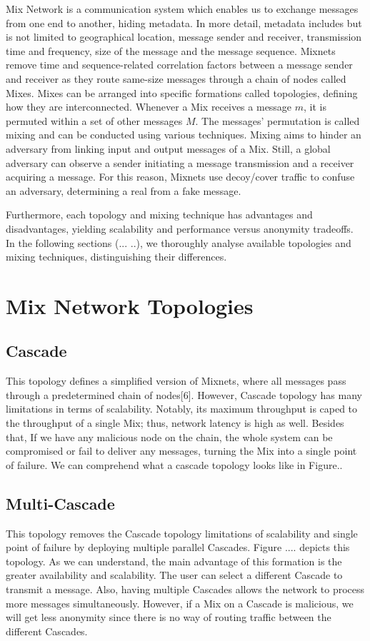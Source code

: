 \documentclass[logo,msc,cyber]{infthesis}   %
\begin{document}
Mix Network is a communication system which enables us to exchange messages from
one end to another, hiding metadata. In more detail, metadata includes but is
not limited to geographical location, message sender and receiver, transmission
time and frequency, size of the message and the message sequence. Mixnets remove
time and sequence-related correlation factors between a message sender and
receiver as they route same-size messages through a chain of nodes called Mixes.
Mixes can be arranged into specific formations called topologies, defining how
they are interconnected. Whenever a Mix receives a message $m$, it is permuted
within a set of other messages $M$. The messages' permutation is called mixing and
can be conducted using various techniques. Mixing aims to hinder an adversary
from linking input and output messages of a Mix. Still, a global adversary can
observe a sender initiating a message transmission and a receiver acquiring a
message. For this reason, Mixnets use decoy/cover traffic to confuse an
adversary, determining a real from a fake message. 

Furthermore, each topology and mixing technique has advantages and
disadvantages, yielding scalability and performance versus anonymity tradeoffs.
In the following sections (... ..), we thoroughly analyse available topologies
and mixing techniques, distinguishing their differences.


\section{Mix Network Topologies}

\subsection{Cascade}
This topology defines a simplified version of Mixnets, where all messages pass
through a predetermined chain of nodes[6]. However, Cascade topology has many
limitations in terms of scalability. Notably, its maximum throughput is caped to
the throughput of a single Mix; thus, network latency is high as well. Besides
that, If we have any malicious node on the chain, the whole system can be
compromised or fail to deliver any messages, turning the Mix into a single point
of failure. We can comprehend what a cascade topology looks like in Figure..

\subsection{Multi-Cascade}
This topology removes the Cascade topology limitations of scalability and
single point of failure by deploying multiple parallel Cascades. Figure ....
depicts this topology. As we can understand, the main advantage of this formation is
the greater availability and scalability. The user can select a different
Cascade to transmit a message. Also, having multiple Cascades allows the network
to process more messages simultaneously. However, if a Mix on a Cascade is
malicious, we will get less anonymity since there is no way of routing traffic
between the different Cascades.
\end{document}
